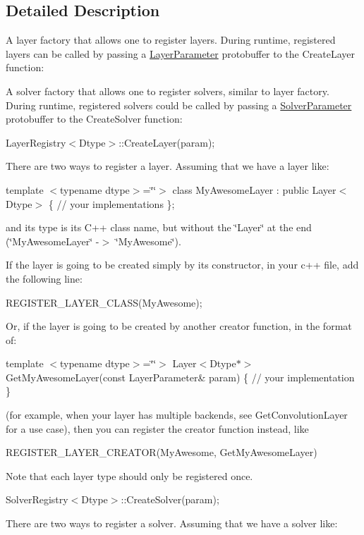 \subsection{Detailed Description}
A layer factory that allows one to register layers. During runtime, registered layers can be called by passing a \mbox{\hyperlink{classcaffe_1_1_layer_parameter}{Layer\+Parameter}} protobuffer to the Create\+Layer function\+: 

A solver factory that allows one to register solvers, similar to layer factory. During runtime, registered solvers could be called by passing a \mbox{\hyperlink{classcaffe_1_1_solver_parameter}{Solver\+Parameter}} protobuffer to the Create\+Solver function\+:

Layer\+Registry$<$\+Dtype$>$\+::\+Create\+Layer(param);

There are two ways to register a layer. Assuming that we have a layer like\+:

template $<$typename dtype$>$=\char`\"{}\char`\"{}$>$ class My\+Awesome\+Layer \+: public Layer$<$\+Dtype$>$ \{ // your implementations \};

and its type is its C++ class name, but without the \char`\"{}\+Layer\char`\"{} at the end (\char`\"{}\+My\+Awesome\+Layer\char`\"{} -\/$>$ \char`\"{}\+My\+Awesome\char`\"{}).

If the layer is going to be created simply by its constructor, in your c++ file, add the following line\+:

R\+E\+G\+I\+S\+T\+E\+R\+\_\+\+L\+A\+Y\+E\+R\+\_\+\+C\+L\+A\+S\+S(\+My\+Awesome);

Or, if the layer is going to be created by another creator function, in the format of\+:

template $<$typename dtype$>$=\char`\"{}\char`\"{}$>$ Layer$<$\+Dtype$\ast$$>$ Get\+My\+Awesome\+Layer(const Layer\+Parameter\& param) \{ // your implementation \}

(for example, when your layer has multiple backends, see Get\+Convolution\+Layer for a use case), then you can register the creator function instead, like

R\+E\+G\+I\+S\+T\+E\+R\+\_\+\+L\+A\+Y\+E\+R\+\_\+\+C\+R\+E\+A\+T\+O\+R(\+My\+Awesome, Get\+My\+Awesome\+Layer)

Note that each layer type should only be registered once.

Solver\+Registry$<$\+Dtype$>$\+::\+Create\+Solver(param);

There are two ways to register a solver. Assuming that we have a solver like\+:

